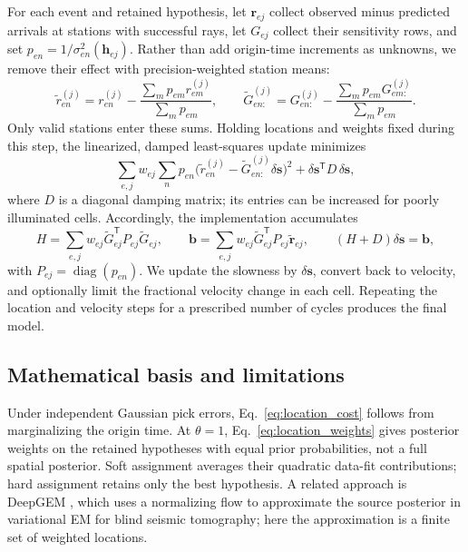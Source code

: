 \documentclass[12pt, a4paper]{article}
\begin{document}
For each event and retained hypothesis, let $\mathbf{r}_{ej}$ collect observed minus predicted arrivals at stations with successful rays, let $G_{ej}$ collect their sensitivity rows, and set $p_{en}=1/\sigma_{en}^2(\mathbf{h}_{ej})$. Rather than add origin-time increments as unknowns, we remove their effect with precision-weighted station means:
\begin{equation}
\widetilde{r}_{en}^{(j)}=r_{en}^{(j)}-\frac{\sum_m p_{em}r_{em}^{(j)}}{\sum_m p_{em}},\qquad
\widetilde{G}_{en:}^{(j)}=G_{en:}^{(j)}-\frac{\sum_m p_{em}G_{em:}^{(j)}}{\sum_m p_{em}}.
\label{eq:centered_rows}
\end{equation}
Only valid stations enter these sums. Holding locations and weights fixed during this step, the linearized, damped least-squares update minimizes
\begin{equation}
\sum_{e,j}w_{ej}\sum_{n}p_{en}
\bigl(\widetilde{r}_{en}^{(j)}-\widetilde{G}_{en:}^{(j)}\delta\mathbf{s}\bigr)^2
+\delta\mathbf{s}^{\mathsf T}D\,\delta\mathbf{s},
\label{eq:mstep_objective}
\end{equation}
where $D$ is a diagonal damping matrix; its entries can be increased for poorly illuminated cells. Accordingly, the implementation accumulates
\begin{equation}
H=\sum_{e,j}w_{ej}\widetilde{G}_{ej}^{\mathsf T}P_{ej}\widetilde{G}_{ej},\qquad
\mathbf{b}=\sum_{e,j}w_{ej}\widetilde{G}_{ej}^{\mathsf T}P_{ej}\widetilde{\mathbf{r}}_{ej},\qquad
(H+D)\delta\mathbf{s}=\mathbf{b},
\label{eq:normal_equations}
\end{equation}
with $P_{ej}=\operatorname{diag}(p_{en})$. We update the slowness by $\delta\mathbf{s}$, convert back to velocity, and optionally limit the fractional velocity change in each cell. Repeating the location and velocity steps for a prescribed number of cycles produces the final model.

\subsection{Mathematical basis and limitations}
\label{subsec:mathematical_basis}

Under independent Gaussian pick errors, Eq.~\eqref{eq:location_cost} follows from marginalizing the origin time. At $\theta=1$, Eq.~\eqref{eq:location_weights} gives posterior weights on the retained hypotheses with equal prior probabilities, not a full spatial posterior. Soft assignment averages their quadratic data-fit contributions; hard assignment retains only the best hypothesis. A related approach is DeepGEM \parencite{gao2021}, which uses a normalizing flow to approximate the source posterior in variational EM for blind seismic tomography; here the approximation is a finite set of weighted locations.
\end{document}
